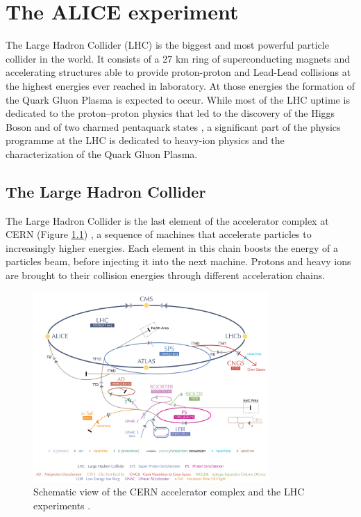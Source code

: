 %
\chapter{The ALICE experiment}
\label{sec:3}


The Large Hadron Collider (LHC) is the biggest and most powerful particle collider in the world.
It consists of a 27 km ring of superconducting magnets and accelerating structures able to
provide proton-proton and Lead-Lead collisions at the highest energies ever reached in laboratory.
At those energies the formation of the Quark Gluon Plasma is expected to occur.
While most of the LHC uptime is dedicated to the proton–proton physics that led to the discovery of 
the Higgs Boson \cite{atlashiggs,cmshiggs} and of two charmed pentaquark states \cite{lhcbpenta}, 
a significant part of the physics programme at the LHC is dedicated to heavy-ion physics and the 
characterization of the Quark Gluon Plasma.

\section{The Large Hadron Collider} \label{sec:3.1}

The Large Hadron Collider is the last element of the accelerator complex at CERN (Figure \ref{fig:lhc})
, a sequence of machines that accelerate particles to increasingly higher energies. Each element in
this chain boosts the energy of a particles beam, before injecting it into the next machine. 
Protons and heavy ions are brought to their collision energies through different acceleration chains.

\begin{figure}
    \centering
    \includegraphics[width=0.8\textwidth]{gfx/lhc}
	\caption{Schematic view of the CERN accelerator complex and the LHC experiments \cite{lhc}.}
	\label{fig:lhc}
\end{figure}

